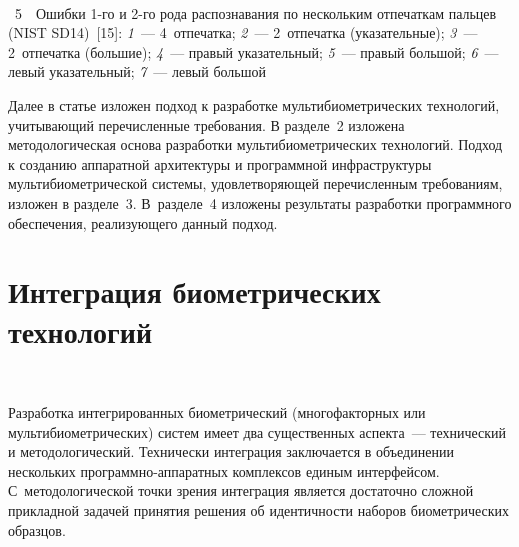   \begin{multicols}{2}
  

\begin{center}
\mbox{%
\epsfxsize=80mm  
 }
\end{center}
\vspace*{3pt}
{{\figurename~5}\ \ \small{Ошибки 1-го и 2-го рода распознавания по нескольким отпечаткам 
пальцев (NIST SD14)~[15]: 
\textit{1}~--- 4~отпечатка;
\textit{2}~--- 2~отпечатка (указательные);
\textit{3}~---  2~отпечатка (большие);
\textit{4}~--- правый указательный;
\textit{5}~---  правый большой;
\textit{6}~---  левый указательный;
\textit{7}~--- левый большой}}
\bigskip
\addtocounter{figure}{1}  

  
Далее в статье изложен подход к разработке мультибиометрических
технологий, учитывающий перечисленные требования.  
     В разделе~2 изложена методологическая основа разработки 
муль\-ти\-биомет\-ри\-че\-ских технологий. Подход к созданию аппаратной 
архитектуры и программной инфраструктуры мультибиометрической системы, 
удов\-ле\-тво\-ря\-ющей перечисленным требованиям, изложен в разделе~3. 
В~разделе~4 изложены результаты разработки программного обеспечения, 
реа\-ли\-зу\-юще\-го данный подход. 
{ %

}

  
  \section{Интеграция биометрических технологий}
  
 \vspace*{-18pt}
  
   \begin{figure*} %
\vspace*{1pt}
\begin{center}
\mbox{%
\epsfxsize=143.132mm  
 }
\end{center}
\vspace*{-9pt}
  \end{figure*}
  
   Разработка интегрированных биометрический (многофакторных или 
мультибиометрических) %
сис\-тем имеет два существенных аспекта~--- 
технический и методологический. Технически интеграция заключается в 
объединении нескольких програм\-мно-ап\-па\-рат\-ных комплексов единым 
интерфейсом. С~методологической точки зрения интеграция является 
достаточно сложной прикладной задачей принятия решения об идентичности 
наборов биометрических  образцов. 
 

\end{multicols}
